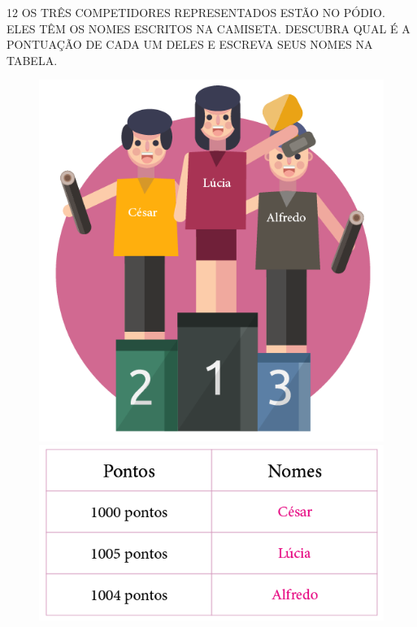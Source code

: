 \num{12} OS TRÊS COMPETIDORES REPRESENTADOS ESTÃO NO PÓDIO. ELES TÊM OS NOMES ESCRITOS NA CAMISETA. DESCUBRA QUAL É A PONTUAÇÃO DE CADA UM DELES E ESCREVA SEUS NOMES NA TABELA.


\begin{figure}[htpb!]
\centering
\includegraphics[width=.8\textwidth]{../ilustracoes/MAT1/SAEB_1ANO_MAT_FIGURA13.png}
\includegraphics[width=.8\textwidth]{../ilustracoes/MAT1/SAEB_1ANO_MAT_FIGURA13a.png}
\end{figure}



